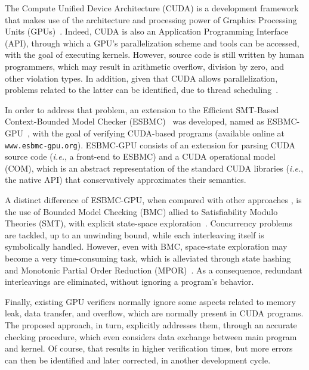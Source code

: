 \documentclass{llncs}
\begin{document}
The Compute Unified Device Architecture (CUDA) is a development framework that makes use of the architecture and processing power of Graphics Processing Units (GPUs)~\cite{cuda:2012}. Indeed, CUDA is also an Application Programming Interface (API), through which a GPU's parallelization scheme and tools can be accessed, with the goal of executing kernels. However, source code is still written by human programmers, which may result in arithmetic overflow, division by zero, and other violation types. In addition, given that CUDA allows parallelization, problems related to the latter can be identified, due to thread scheduling~\cite{betts:2012}.

In order to address that problem, an extension to the Efficient SMT-Based Context-Bounded Model Checker (ESBMC)~\cite{cordeiro:2012} was developed, named as ESBMC-GPU~\cite{Pereira15,Pereira16,pereira:2016}, with the goal of verifying CUDA-based programs (available online at \texttt{www.esbmc-gpu.org}). ESBMC-GPU consists of an extension for parsing CUDA source code ({\it i.e.}, a front-end to ESBMC) and a CUDA operational model (COM), which is an abstract representation of the standard CUDA libraries ({\it i.e.}, the native API) that conservatively approximates their semantics. 

A distinct difference of ESBMC-GPU, when compared with other approaches \cite{betts:2012,Li:2010,Li:2012,civl:2015}, is the use of Bounded Model Checking (BMC) allied to Satisfiability Modulo Theories (SMT), with explicit state-space exploration~\cite{cordeiro:2012}. Concurrency problems are tackled, up to an unwinding bound, while each interleaving itself is symbolically handled. However, even with BMC, space-state exploration may become a very time-consuming task, which is alleviated through state hashing and Monotonic Partial Order Reduction (MPOR)~\cite{KahlonWG09}. As a consequence, redundant interleavings are eliminated, without ignoring a program's behavior.


Finally, existing GPU verifiers normally ignore some aspects related to memory leak, data transfer, and overflow, which are normally present in CUDA programs. The proposed approach, in turn, explicitly addresses them, through an accurate checking procedure, which even considers data exchange between main program and kernel. Of course, that results in higher verification times, but more errors can then be identified and later corrected, in another development cycle.

\end{document}

